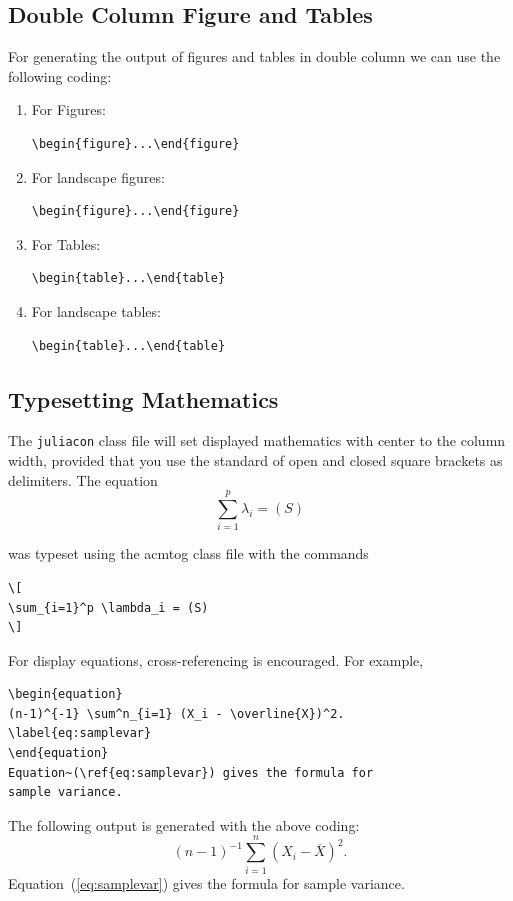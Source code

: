 \documentclass{juliacon}
\begin{document}
\subsection{Double Column Figure and Tables}
\label{subsub:double_fig_tab}
For generating the output of figures and tables in double column
we can use the following coding:

\begin{enumerate}
\item For Figures:
\begin{verbatim}
\begin{figure}...\end{figure}
\end{verbatim}
\item For landscape figures:
\begin{verbatim}
\begin{figure}...\end{figure}
\end{verbatim}
\item For Tables:
\begin{verbatim}
\begin{table}...\end{table}
\end{verbatim}
\item For landscape tables:
\begin{verbatim}
\begin{table}...\end{table}
\end{verbatim}
\end{enumerate}

\subsection{Typesetting Mathematics}
\label{subsub:type_math}
The \verb|juliacon| class file will set displayed mathematics with center to
the column width, provided that you use the \LaTeXe{} standard of
open and closed square brackets as delimiters.
The equation
\[
\sum_{i=1}^p \lambda_i = (S)
\]

was typeset using the acmtog class file with the commands

\begin{verbatim}
\[
\sum_{i=1}^p \lambda_i = (S)
\]
\end{verbatim}

For display equations, cross-referencing is encouraged. For example,
\begin{verbatim}
\begin{equation}
(n-1)^{-1} \sum^n_{i=1} (X_i - \overline{X})^2.
\label{eq:samplevar}
\end{equation}
Equation~(\ref{eq:samplevar}) gives the formula for
sample variance.
\end{verbatim}
The following output is generated with the above coding:
\begin{equation}
(n-1)^{-1} \sum^n_{i=1} (X_i - \overline{X})^2.
\label{eq:samplevar}
\end{equation}
Equation~(\ref{eq:samplevar}) gives the formula for
sample variance.
\end{document}
